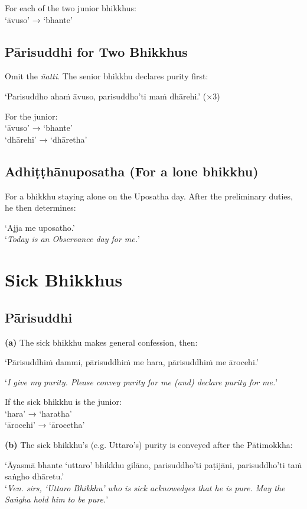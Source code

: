 For each of the two junior bhikkhus:\\
‘āvuso’ → ‘bhante’

\subsection{Pārisuddhi for Two Bhikkhus}

Omit the \emph{ñatti}. The senior bhikkhu declares purity first:

‘Parisuddho ahaṁ āvuso, parisuddho'ti maṁ dhārehi.’ (×3)

For the junior:\\
‘āvuso’ → ‘bhante’\\
‘dhārehi’ → ‘dhāretha’

\subsection{Adhiṭṭhānuposatha (For a lone bhikkhu)}

For a bhikkhu staying alone on the Uposatha day. After the preliminary duties,
he then determines:

‘Ajja me uposatho.’\\
‘\emph{Today is an Observance day for me.}’

\section{Sick Bhikkhus}

\subsection{Pārisuddhi}

\textbf{(a)} The sick bhikkhu makes general confession, then:

‘Pārisuddhiṁ dammi, pārisuddhiṁ me hara, pārisuddhiṁ me ārocehi.’

‘\emph{I give my purity. Please convey purity for me (and) declare purity for me.}’

If the sick bhikkhu is the junior:\\
‘hara’ → ‘haratha’\\
‘ārocehi’ → ‘ārocetha’

\ifhandbookedition
\clearpage
\fi

\textbf{(b)} The sick bhikkhu's (e.g. Uttaro's) purity is conveyed after the
Pātimokkha:

‘Āyasmā bhante ‘uttaro’ bhikkhu gilāno, parisuddho'ti paṭijāni, parisuddho'ti taṁ saṅgho dhāretu.’\\
‘\emph{Ven. sirs, ‘Uttaro Bhikkhu’ who is sick acknowedges that he is pure. May
  the Saṅgha hold him to be pure.}’

